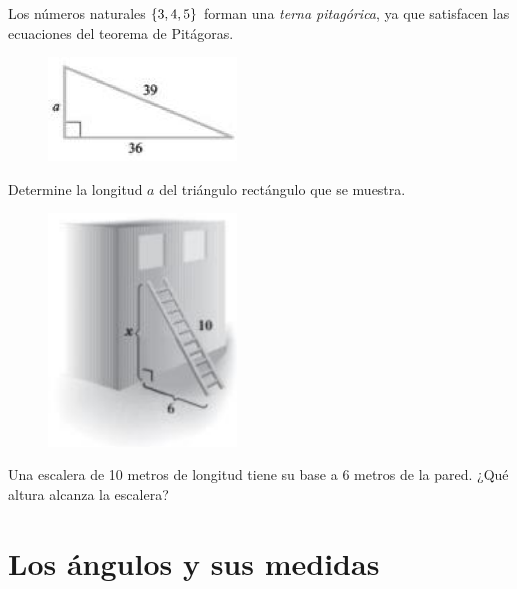 {}
	Los números naturales $\left\{ 3,4,5 \right\}$ forman una \emph{terna pitagórica}, ya que satisfacen las ecuaciones del teorema de Pitágoras. 

\begin{figure}
\centering
\includegraphics[width=5cm,keepaspectratio=true]{./trig/trig9450.png}
\label{fig:9450}
\end{figure}

	\begin{problema}
		\label{exmp:9408}		
		Determine la longitud $a$ del triángulo rectángulo que se muestra.
	\end{problema}
	
\begin{figure}
\centering
\includegraphics[width=5cm,keepaspectratio=true]{./trig/trig9451.png}
\label{fig:9451}
\end{figure}

	\begin{problema}
		\label{exmp:9409}

		Una escalera de 10 metros de longitud tiene su base a 6 metros de la pared. ¿Qué altura alcanza la escalera?
	\end{problema}
	


\section{Los ángulos y sus medidas}

